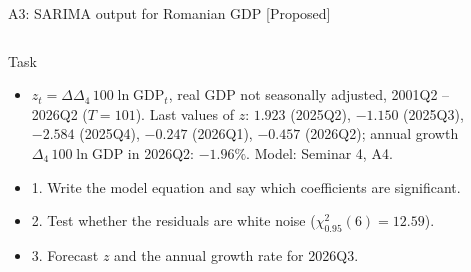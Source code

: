 \begin{frame}{A3: SARIMA output for Romanian GDP [Proposed]}
\propsub
\itemsize{\scriptsize}
\begin{columns}[T]
\begin{column}{\taskw}
\begin{block}{Task}
\begin{center}
\scriptsize
{}
\end{center}
\begin{itemize}
    \item $z_t = \Delta\Delta_4\,100\ln \mathrm{GDP}_t$, real GDP not seasonally adjusted, 2001Q2 -- 2026Q2 ($T = 101$). Last values of $z$: $1.923$ (2025Q2), $\ensuremath{-}1.150$ (2025Q3), $\ensuremath{-}2.584$ (2025Q4), $\ensuremath{-}0.247$ (2026Q1), $\ensuremath{-}0.457$ (2026Q2); annual growth $\Delta_4\,100\ln \mathrm{GDP}$ in 2026Q2: $\ensuremath{-}1.96\%$. Model: Seminar 4, A4.
    \item 1. Write the model equation and say which coefficients are significant.
    \item 2. Test whether the residuals are white noise ($\chi^2_{0.95}(6) = 12.59$).
    \item 3. Forecast $z$ and the annual growth rate for 2026Q3.
\end{itemize}
\end{block}
\end{column}
\begin{column}{\solw}
\end{column}
\end{columns}
\end{frame}


